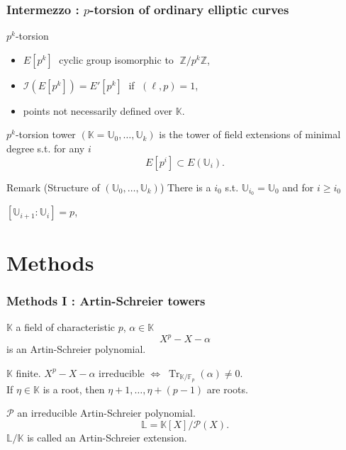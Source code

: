 \documentclass[10pt]{beamer}
\renewcommand{\ge}{\geqslant}  %
\newcommand{\Z}{\mathbb{Z}}  %
\newcommand{\K}{\mathbb{K}}  %
\newcommand{\LK}{\mathbb{L}}  %
\newcommand{\U}{\mathbb{U}}  %
\newcommand{\F}{\mathbb{F}}  %
\DeclareMathOperator{\Tr}{Tr}  %
\newcommand{\AS}[1]{\mathcal{#1}}  %
\newcommand{\0}{\mathcal{O}}  %
\newcommand{\isog}[1]{\mathcal{#1}}  %
\newcommand{\I}{\isog{I}}  %
\begin{document}
\begin{frame}
  \frametitle{Intermezzo : $p$-torsion of ordinary elliptic curves}
  
  \begin{block}{$p^k$-torsion}
    \begin{itemize}
    \item $E[p^k]\;$ cyclic group isomorphic to $\;\Z/p^k\Z$,
    \item $\I(E[p^k]) = E'[p^k]\;$ if $\;(\ell,p)=1$,
    \item points not necessarily defined over $\K$.
    \end{itemize}
  \end{block}

  \begin{block}{$p^k$-torsion tower}
    $(\K = \U_0, \ldots, \U_k)$ is the tower of field extensions of minimal
    degree s.t. for any $i$
    \[E[p^i] \subset E(\U_i)\text{.}\]
  \end{block}

  \begin{block}{Remark (Structure of $(\U_0, \ldots, \U_k)$)}
    There is a $i_0$ s.t. $\U_{i_0} = \U_0$ and for $i \ge i_0$
    \begin{center}
      $[\U_{i+1}:\U_i] = p$,
    \end{center}
  \end{block}
\end{frame}


\section{Methods}

\begin{frame}
  \frametitle{Methods I : Artin-Schreier towers}

  \begin{definition}
    $\K$ a field of characteristic $p$, $\alpha\in\K$
    \[X^p - X - \alpha\]
    is an Artin-Schreier polynomial.
  \end{definition}
  
  \begin{theorem}
    $\K$ finite. $X^p - X - \alpha$ irreducible $\Leftrightarrow \;
    \Tr_{\K/\F_p}(\alpha) \ne 0$.\\ If $\eta\in\K$ is a root, then $\eta
    + 1, \ldots, \eta + (p-1)$ are roots.
  \end{theorem}
  
  \begin{definition}
    $\AS{P}$ an irreducible Artin-Schreier polynomial. 
    \[\LK = \K[X]/\AS{P}(X) \text{.}\]
    $\LK/\K$ is called an Artin-Schreier extension.
  \end{definition}
\end{frame}
\end{document}
